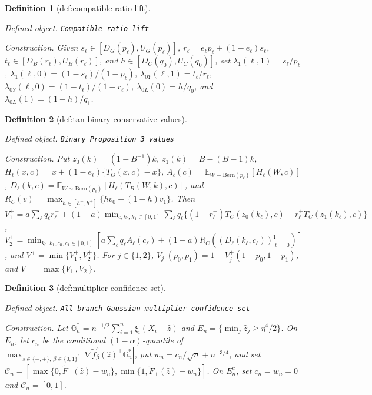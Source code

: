 \documentclass{article}
\newtheorem{definition}{Definition}
\begin{document}
\begin{definition}[def:compatible-ratio-lift]\label{def:compatible-ratio-lift}
\par\smallskip\noindent\emph{Defined object.} \texttt{Compatible ratio lift}
\par\smallskip\noindent\emph{Construction.} Given \(s_\ell\in[D_G(p_\ell),U_G(p_\ell)]\), \(r_\ell=e_\ell p_\ell+(1-e_\ell)s_\ell\), \(t_\ell\in[D_B(r_\ell),U_B(r_\ell)]\), and \(h\in[D_C(q_0),U_C(q_0)]\), set \(\lambda_1(\ell,1)=s_\ell/p_\ell\), \(\lambda_1(\ell,0)=(1-s_\ell)/(1-p_\ell)\), \(\lambda_{0Y}(\ell,1)=t_\ell/r_\ell\), \(\lambda_{0Y}(\ell,0)=(1-t_\ell)/(1-r_\ell)\), \(\lambda_{0L}(0)=h/q_0\), and \(\lambda_{0L}(1)=(1-h)/q_1\).
\end{definition}

\begin{definition}[def:tan-binary-conservative-values]\label{def:tan-binary-conservative-values}
\par\smallskip\noindent\emph{Defined object.} \texttt{Binary Proposition 3 values}
\par\smallskip\noindent\emph{Construction.} Put \(z_0(k)=(1-B^{-1})k\), \(z_1(k)=B-(B-1)k\), \(H_\ell(x,c)=x+(1-e_\ell)\{T_G(x,c)-x\}\), \(A_\ell(c)=\mathbb E_{W\sim\mathrm{Bern}(p_\ell)}[H_\ell(W,c)]\), \(D_\ell(k,c)=\mathbb E_{W\sim\mathrm{Bern}(p_\ell)}[H_\ell(T_B(W,k),c)]\), and \(R_C(v)=\max_{h\in[h^-,h^+]}\{hv_0+(1-h)v_1\}\). Then \(V_1^+=a\sum_\ell q_\ell r_\ell^+ +(1-a)\min_{c,k_0,k_1\in[0,1]}\sum_\ell q_\ell\{(1-r_\ell^+)T_C(z_0(k_\ell),c)+r_\ell^+T_C(z_1(k_\ell),c)\}\), \(V_2^+=\min_{k_0,k_1,c_0,c_1\in[0,1]}[a\sum_\ell q_\ell A_\ell(c_\ell)+(1-a)R_C((D_\ell(k_\ell,c_\ell))_{\ell=0}^1)]\), and \(V^+=\min\{V_1^+,V_2^+\}\). For \(j\in\{1,2\}\), \(V_j^-(p_0,p_1)=1-V_j^+(1-p_0,1-p_1)\), and \(V^-=\max\{V_1^-,V_2^-\}\).
\end{definition}

\begin{definition}[def:multiplier-confidence-set]\label{def:multiplier-confidence-set}
\par\smallskip\noindent\emph{Defined object.} \texttt{All-\allowbreak{}branch Gaussian-\allowbreak{}multiplier confidence set}
\par\smallskip\noindent\emph{Construction.} Let \(\mathbb G_n^*=n^{-1/2}\sum_{i=1}^n\xi_i(X_i-\widehat z)\) and \(E_n=\{\min_j\widehat z_j\geq\eta^4/2\}\). On \(E_n\), let \(c_n\) be the conditional \((1-\alpha)\)-quantile of \(\max_{s\in\{-,+\},\,\beta\in\{0,1\}^6}|\nabla\widetilde f_\beta^s(\widehat z)^\top\mathbb G_n^*|\), put \(w_n=c_n/\sqrt n+n^{-3/4}\), and set \(\mathcal C_n=[\max\{0,\widetilde F_-(\widehat z)-w_n\},\min\{1,\widetilde F_+(\widehat z)+w_n\}]\). On \(E_n^c\), set \(c_n=w_n=0\) and \(\mathcal C_n=[0,1]\).
\end{definition}
\end{document}
